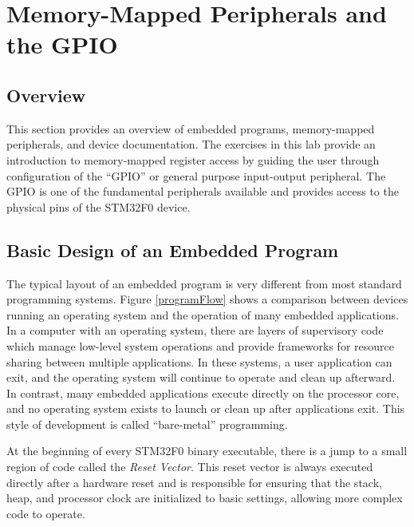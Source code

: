 \documentclass[11pt,fleqn]{book} %
\begin{document}
\chapter{Memory-Mapped Peripherals and the GPIO}

\section{Overview}
This section provides an overview of embedded programs, memory-mapped peripherals, and device documentation. The exercises in this lab provide an introduction to memory-mapped register access by guiding the user through configuration of the ``GPIO'' or general purpose input-output peripheral. The GPIO is one of the fundamental peripherals available and provides access to the physical pins of the STM32F0 device. 


\section{Basic Design of an Embedded Program}


The typical layout of an embedded program is very different from most standard programming systems. Figure \vref{programFlow} shows a comparison between devices running an operating system and the operation of many embedded applications. 
In a computer with an operating system, there are layers of supervisory code which manage low-level system operations and provide frameworks for resource sharing between multiple applications. In these systems, a user application can exit, and the operating system will continue to operate and clean up afterward. In contrast, many embedded applications execute directly on the processor core, and no operating system exists to launch or clean up after applications exit. This style of development is called ``bare-metal'' programming. 

At the beginning of every STM32F0 binary executable, there is a jump to a small region of code called the \textit{Reset Vector}. This reset vector is always executed directly after a hardware reset and is responsible for ensuring that the stack, heap, and processor clock are initialized to basic settings, allowing more complex code to operate.
\end{document}
